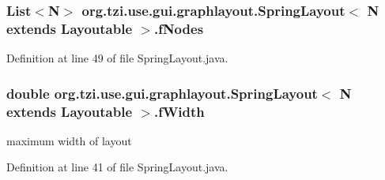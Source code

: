 \hypertarget{classorg_1_1tzi_1_1use_1_1gui_1_1graphlayout_1_1_spring_layout_3_01_n_01extends_01_layoutable_01_4_a67c950738242a1d3f023750a420c8cd6}{
\subsubsection[{f\-Nodes}]{\setlength{\rightskip}{0pt plus 5cm}List$<$N$>$ org.\-tzi.\-use.\-gui.\-graphlayout.\-Spring\-Layout$<$ N extends {\bf Layoutable} $>$.f\-Nodes\hspace{0.3cm}{\ttfamily [protected]}}}\label{classorg_1_1tzi_1_1use_1_1gui_1_1graphlayout_1_1_spring_layout_3_01_n_01extends_01_layoutable_01_4_a67c950738242a1d3f023750a420c8cd6}


Definition at line 49 of file Spring\-Layout.\-java.

\hypertarget{classorg_1_1tzi_1_1use_1_1gui_1_1graphlayout_1_1_spring_layout_3_01_n_01extends_01_layoutable_01_4_a32ef07ad497d7300fa8183856a2c59bc}{
\subsubsection[{f\-Width}]{\setlength{\rightskip}{0pt plus 5cm}double org.\-tzi.\-use.\-gui.\-graphlayout.\-Spring\-Layout$<$ N extends {\bf Layoutable} $>$.f\-Width\hspace{0.3cm}{\ttfamily [protected]}}}\label{classorg_1_1tzi_1_1use_1_1gui_1_1graphlayout_1_1_spring_layout_3_01_n_01extends_01_layoutable_01_4_a32ef07ad497d7300fa8183856a2c59bc}
maximum width of layout 

Definition at line 41 of file Spring\-Layout.\-java.

